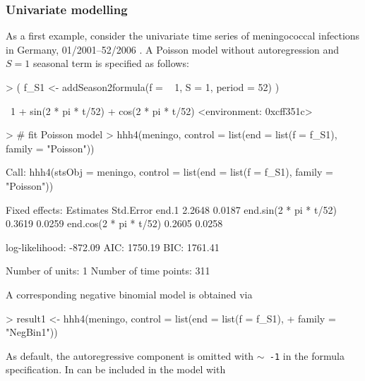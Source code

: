 \documentclass[a4paper,11pt]{article}
\newcommand{\code}[1]{\texttt{#1}}
\begin{document}
\subsubsection{Univariate modelling}

As a first example, consider the univariate time series of meningococcal infections
in Germany, 01/2001--52/2006 \citep[cf.~Tab.~1 in ][]{paul-etal-2008}.
A Poisson model without autoregression and $S=1$ seasonal term is specified 
as follows:
\begin{Schunk}
\begin{Sinput}
> ( f_S1 <- addSeason2formula(f = ~ 1, S = 1, period = 52) )
\end{Sinput}
\begin{Soutput}
~1 + sin(2 * pi * t/52) + cos(2 * pi * t/52)
<environment: 0xcff351c>
\end{Soutput}
\begin{Sinput}
> # fit Poisson model
> hhh4(meningo, control = list(end = list(f = f_S1), family = "Poisson")) 
\end{Sinput}
\begin{Soutput}
Call: 
hhh4(stsObj = meningo, control = list(end = list(f = f_S1), family = "Poisson"))


Fixed effects: 
                        Estimates  Std.Error
end.1                      2.2648     0.0187
end.sin(2 * pi * t/52)     0.3619     0.0259
end.cos(2 * pi * t/52)     0.2605     0.0258

log-likelihood:    -872.09 
AIC:               1750.19 
BIC:               1761.41 

Number of units:          1 
Number of time points:    311 
\end{Soutput}
\end{Schunk}
A corresponding negative binomial model is obtained via
\begin{Schunk}
\begin{Sinput}
> result1 <- hhh4(meningo, control = list(end = list(f = f_S1), 
+                                         family = "NegBin1")) 
\end{Sinput}
\end{Schunk}
As default, the autoregressive component is omitted with \code{$\sim$ -1} 
in the formula specification. In can be included in the model with
\end{document}
